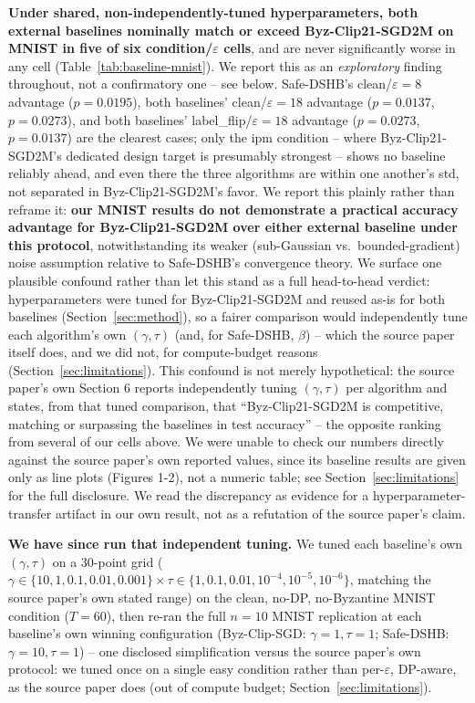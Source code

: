\documentclass{article}
\begin{document}
\textbf{Under shared, non-independently-tuned hyperparameters, both external
baselines nominally match or exceed Byz-Clip21-SGD2M on MNIST in five of six
condition/$\varepsilon$ cells}, and are never significantly worse in any cell
(Table~\ref{tab:baseline-mnist}). We report this as an \emph{exploratory}
finding throughout, not a confirmatory one -- see below.
Safe-DSHB's clean/$\varepsilon{=}8$ advantage ($p{=}0.0195$), both baselines'
clean/$\varepsilon{=}18$ advantage ($p{=}0.0137$, $p{=}0.0273$), and both
baselines' label\_flip/$\varepsilon{=}18$ advantage ($p{=}0.0273$,
$p{=}0.0137$) are the clearest cases; only the ipm condition -- where
Byz-Clip21-SGD2M's dedicated design target is presumably strongest -- shows no
baseline reliably ahead, and even there the three algorithms are within one
another's std, not separated in Byz-Clip21-SGD2M's favor. We report this
plainly rather than reframe it: \textbf{our MNIST results do not demonstrate a
practical accuracy advantage for Byz-Clip21-SGD2M over either external
baseline under this protocol}, notwithstanding its weaker (sub-Gaussian vs.\
bounded-gradient) noise assumption relative to Safe-DSHB's convergence theory.
We surface one plausible confound rather than let this stand as a full
head-to-head verdict: hyperparameters were tuned for Byz-Clip21-SGD2M and
reused as-is for both baselines (Section~\ref{sec:method}), so a fairer
comparison would independently tune each algorithm's own $(\gamma,\tau)$ (and,
for Safe-DSHB, $\beta$) -- which the source paper itself does, and we did not,
for compute-budget reasons (Section~\ref{sec:limitations}). This confound is
not merely hypothetical: the source paper's own Section 6 reports
independently tuning $(\gamma,\tau)$ per algorithm and states, from that
tuned comparison, that ``Byz-Clip21-SGD2M is competitive, matching or
surpassing the baselines in test accuracy'' -- the opposite ranking from
several of our cells above. We were unable to check our numbers directly
against the source paper's own reported values, since its baseline results
are given only as line plots (Figures 1-2), not a numeric table; see
Section~\ref{sec:limitations} for the full disclosure. We read the
discrepancy as evidence for a hyperparameter-transfer artifact in our own
result, not as a refutation of the source paper's claim.

\textbf{We have since run that independent tuning.} We tuned each baseline's own $(\gamma,\tau)$ on a 30-point grid
($\gamma\in\{10,1,0.1,0.01,0.001\}\times\tau\in\{1,0.1,0.01,10^{-4},10^{-5},
10^{-6}\}$, matching the source paper's own stated range) on the clean,
no-DP, no-Byzantine MNIST condition ($T{=}60$), then re-ran the full $n{=}10$
MNIST replication at each baseline's own winning configuration
(Byz-Clip-SGD: $\gamma{=}1,\tau{=}1$; Safe-DSHB: $\gamma{=}10,\tau{=}1$) --
one disclosed simplification versus the source paper's own protocol: we
tuned once on a single easy condition rather than per-$\varepsilon$,
DP-aware, as the source paper does (out of compute budget;
Section~\ref{sec:limitations}).
\end{document}
